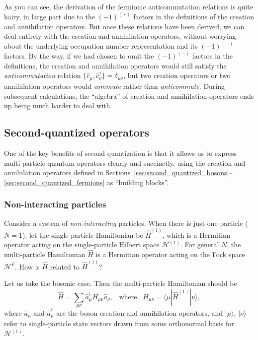 \documentclass[pra,12pt]{revtex4}
\begin{document}
As you can see, the derivation of the fermionic anticommutation
relations is quite hairy, in large part due to the $(-1)^{(\cdots)}$
factors in the definitions of the creation and annihilation operators.
But once these relations have been derived, we can deal entirely with
the creation and annihilation operators, without worrying about the
underlying occupation number representation and its $(-1)^{(\cdots)}$
factors.  By the way, if we had chosen to omit the $(-1)^{(\cdots)}$
factors in the definitions, the creation and annihilation operators
would still satisfy the \textit{anticommutation} relation
$\{\hat{c}_\mu,\hat{c}_\nu^\dagger\}=\delta_{\mu\nu}$, but two
creation operators or two annihilation operators would
\textit{commute} rather than \textit{anticommute}.  During subsequent
calculations, the ``algebra'' of creation and annihilation operators
ends up being much harder to deal with.

\subsection{Second-quantized operators}
\label{sec:second_quant_op}

One of the key benefits of second quantization is that it allows us to
express multi-particle quantum operators clearly and succinctly, using
the creation and annihilation operators defined in
Sections~\ref{sec:second_quantized_bosons}--\ref{sec:second_quantized_fermions}
as ``building blocks''.

\subsubsection{Non-interacting particles}

Consider a system of \textit{non-interacting} particles.  When there
is just one particle ($N=1$), let the single-particle Hamiltonian be
$\hat{H}^{(1)}$, which is a Hermitian operator acting on the
single-particle Hilbert space $\mathscr{H}^{(1)}$.  For general $N$,
the multi-particle Hamiltonian $\hat{H}$ is a Hermitian operator
acting on the Fock space $\mathscr{H}^F$.  How is $\hat{H}$ related to
$\hat{H}^{(1)}$?

Let us take the bosonic case.  Then the multi-particle Hamiltonian
should be
\begin{equation}
  \hat{H} = \sum_{\mu\nu} \hat{a}^\dagger_\mu H_{\mu\nu} \hat{a}_\nu,
  \;\;\; \mathrm{where}\;\;\;
  H_{\mu\nu} = \langle\mu|\hat{H}^{(1)}|\nu\rangle,
  \label{twobosonH}
\end{equation}
where $\hat{a}_\mu$ and $\hat{a}_\mu^\dagger$ are the boson creation
and annihilation operators, and $|\mu\rangle$, $|\nu\rangle$ refer to
single-particle state vectors drawn from some orthonormal basis for
$\mathscr{H}^{(1)}$.
\end{document}
